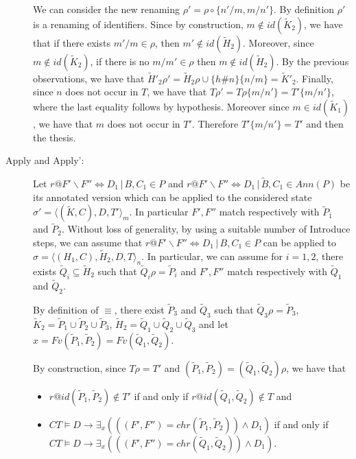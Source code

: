 \documentclass[final]{acmtrans2e}
\newcommand{\la}{\langle}
\newcommand{\ra}{\rangle}
\begin{document}
\begin{description}
We can consider the new renaming $\rho'=\rho \circ \{n'/m, m/n'\}$. By definition $\rho'$ is a renaming of identifiers.
Since by construction, $m \not \in id (\tilde K_2)$, we have that if there exists $m'/m \in \rho$, then $m' \not \in id (\tilde H_2)$. Moreover, since $m \not \in id (\tilde K_2)$, if there is no $m/m' \in \rho$ then $m \not \in id (\tilde H_2)$.  By the previous observations, we have that $\tilde H'_2 \rho'= \tilde H_2 \rho
\cup \{h\#n\} \{n/m\} = \tilde K'_2$.
Finally, since $n$ does not occur in $T$, we have that $T \rho'=T\rho \{ m/n'\}=T'\{ m/n'\}$, where the last equality follows by hypothesis. Moreover  since $m \in id (\tilde K_1)$, we have that $m$ does  not occur in $T'$.
Therefore $T'\{ m/n'\}=T'$ and then the thesis.


\item[Apply and Apply':] Let $r@F'\backslash F'' \Leftrightarrow D_1 \,|\, B, C_1 \in P$ and
 $r@F'\backslash F'' \Leftrightarrow D_1 \,|\, \tilde B, C_1 \in Ann(P)$ be its annotated version which can
be applied to the considered state $\sigma'=\la(\tilde K,C), D, T'\ra_m$. In particular $F',F''$ match respectively with $\tilde P_1$ and
$\tilde P_2$. Without loss of generality, by using a suitable number of Introduce steps, we can assume that
$r@F'\backslash F'' \Leftrightarrow D_1 \,|\, B, C_1 \in P$ can be applied to $\sigma=\la(H_1,C),\tilde H_2, D, T\ra_n$. In particular, we can assume for $i=1,2$, there exists $\tilde Q_i \subseteq \tilde H_2$ such that $\tilde Q_i \rho = \tilde P_i$ and $F',F''$ match respectively with $\tilde Q_1$ and
$\tilde Q_2$.

By definition of $\equiv$, there exist $\tilde P_3$ and $\tilde Q_3$ such that
$\tilde Q_3 \rho = \tilde P_3$,
$\tilde K_2= \tilde P_1 \cup \tilde P_2\cup \tilde P_3$,
$\tilde H_2= \tilde Q_1 \cup \tilde Q_2 \cup \tilde Q_3$ and  let $x =
Fv(\tilde P_1, \tilde P_2)= Fv(\tilde Q_1, \tilde Q_2)$.

By construction, since $T \rho=T'$ and $(\tilde P_1, \tilde P_2)= (\tilde Q_1, \tilde Q_2)\rho$, we have that
\\
\begin{itemize}
\item $r@id(\tilde P_1,\tilde P_2) \not \in T'$ if and only if
$r@id(\tilde Q_1,\tilde Q_2) \not \in T$ and
\item $CT \models D \rightarrow
\exists _{x}(( (F', F'')=chr (\tilde P_1, \tilde P_2))\wedge D_1)$ if and only if
$CT \models D \rightarrow
\exists _{x}( ((F', F'')=chr (\tilde Q_1, \tilde Q_2))\wedge D_1)$.
\end{itemize}



\end{description}
\end{document}

